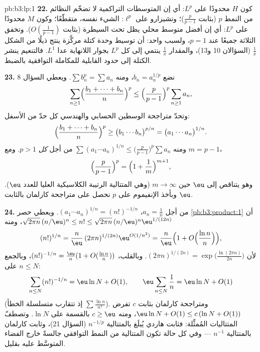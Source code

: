 \begin{solution}{pb:b3:lp:1}
\textbf{22.} كون $H$ محدودًا على $L^p$: أي إن المتوسطات
التراكمية لا تضخّم النظائم من النمط $p$ (بثابت $\frac p{p-1}$)؛
وتشيزارو على $\ell^p$: الشيء نفسه، متقطّعًا؛ وكون $M$ محدودًا
على $L^p$: أي إن أفضل متوسط محلي يظل تحت السيطرة (بثابت
$O(\frac1{p-1})$). وتخفق الثلاثة جميعًا عند $p = 1$، ولسبب
واحد: أن توسيط وحدة كتلة مركَّزة ينتج ذيلًا من الشكل $\frac1x$
(السؤالان 10 و13)، والمقدار $\frac1x$ ينتمي إلى كل $L^p$ بجوار
اللانهاية عدا $L^1$. فالتنعيم ينشر الكتلة إلى حدود القابلية
للمكاملة التوافقية بالضبط.

\textbf{23.} نضع $b_n = a_n^{1/p}$، ومنه $\sum b_n^p = \sum
a_n$. ويعطي السؤال 8
\[
\sum_{n\geq1}\Bigl(\frac{b_1 + \dots + b_n}n\Bigr)^{p}
\leq \Bigl(\frac p{p-1}\Bigr)^{p}\sum_{n\geq1}a_n,
\]
وتحدّ متراجحة الوسطين الحسابي والهندسي كل حدّ من الأسفل:
\[
\Bigl(\frac{b_1 + \dots + b_n}n\Bigr)^{p}
\geq \bigl(b_1\cdots b_n\bigr)^{p/n}
= \bigl(a_1\cdots a_n\bigr)^{1/n}.
\]
ومنه $\sum(a_1\cdots a_n)^{1/n} \leq \bigl(\frac
p{p-1}\bigr)^p\sum a_n$ من أجل \emph{كل} $p > 1$. ومع $m =
p - 1$،
\[
\Bigl(\frac p{p-1}\Bigr)^{p} =
\Bigl(1 + \frac1m\Bigr)^{m+1},
\]
وهو يتناقص إلى $\eu$ حين $m \to \infty$ (وهي المتتالية الرتيبة
الكلاسيكية العليا للعدد $\eu$). وبأخذ الإنفيموم على $p$ نحصل
على متراجحة كارلمان بالثابت $\eu$.

\textbf{24.} من أجل $a_n = \frac1n$، $(a_1\cdots a_n)^{1/n} =
(n!)^{-1/n}$. ويعطي حصر
\cref{pb:b3:product:1} أن $\sqrt{2\pi n}\,(n/\eu)^n \leq n! \leq \sqrt{2\pi
n}\,(n/\eu)^n\eu^{1/(12n)}$، ومنه
\[
(n!)^{1/n} = \frac n\eu\,(2\pi n)^{1/(2n)}
\eu^{O(1/n^2)}
= \frac n\eu\Bigl(1 +
O\Bigl(\frac{\ln n}{n}\Bigr)\Bigr),
\]
لأن $(2\pi n)^{1/(2n)} = \exp\bigl(\frac{\ln(2\pi
n)}{2n}\bigr)$. وبالقلب، $(n!)^{-1/n} = \frac\eu n(1 +
O(\frac{\ln n}n))$، وبالجمع على $n \leq N$:
\[
\sum_{n\leq N}(n!)^{-1/n}
= \eu\ln N + O(1),
\qquad
\eu\sum_{n\leq N}\frac1n = \eu\ln N + O(1)
\]
(إذ تتقارب متسلسلة الخطأ $\sum\frac{\ln n}{n^2}$). ومتراجحة كارلمان بثابت $c$
تفرض $\eu\ln N
+ O(1) \leq c\,(\ln N + O(1))$، ومنه $c \geq \eu$ بالقسمة على $\ln N$. وتصطفّ
المتتاليات المُمثِّلة: فثابت هاردي يُبلَغ بالمتتالية $n^{-1/p}$
(السؤال 21)، وثابت كارلمان بالمتتالية $n^{-1}$ --- وفي كل حالة
تكون المتتالية من النمط التوافقي جالسةً خارج الفضاء المتوسَّط
عليه بقليل.


\end{solution}
